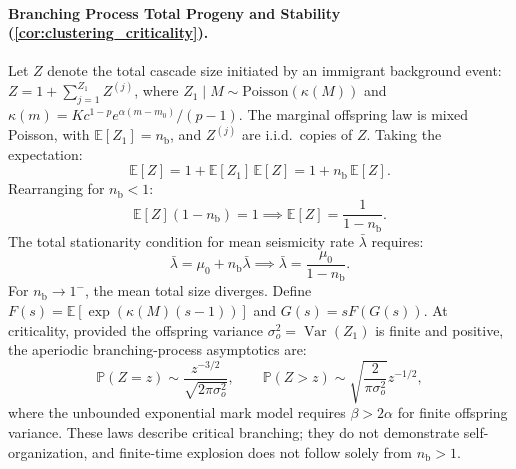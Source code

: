 \paragraph{Branching Process Total Progeny and Stability
(\cref{cor:clustering_criticality}).}
Let $Z$ denote the total cascade size initiated by an immigrant
background event:
$Z = 1 + \sum_{j=1}^{Z_1} Z^{(j)}$, where
$Z_1\mid M\sim\mathrm{Poisson}(\kappa(M))$ and
$\kappa(m)=Kc^{1-p}e^{\alpha(m-m_0)}/(p-1)$.
The marginal offspring law is mixed Poisson, with
$\mathbb{E}[Z_1]=n_{\mathrm{b}}$, and $Z^{(j)}$ are
i.i.d.\ copies of $Z$.
Taking the expectation:
\begin{equation}
  \mathbb{E}[Z] = 1 + \mathbb{E}[Z_1]\,\mathbb{E}[Z] = 1 +
  n_{\mathrm{b}}\,\mathbb{E}[Z].
\end{equation}
Rearranging for $n_{\mathrm{b}} < 1$:
\begin{equation}
  \mathbb{E}[Z](1 - n_{\mathrm{b}}) = 1 \implies \mathbb{E}[Z] =
  \frac{1}{1 - n_{\mathrm{b}}}.
  \label{eq:supp_total_progeny}
\end{equation}
The total stationarity condition for mean seismicity rate
$\bar{\lambda}$ requires:
\begin{equation}
  \bar{\lambda} = \mu_0 + n_{\mathrm{b}}\bar{\lambda} \implies
  \bar{\lambda} = \frac{\mu_0}{1 - n_{\mathrm{b}}}.
\end{equation}
For $n_{\mathrm{b}}\to1^-$, the mean total size diverges. Define
$F(s)=\mathbb{E}[\exp(\kappa(M)(s-1))]$ and $G(s)=sF(G(s))$.
At criticality, provided the offspring variance
$\sigma_o^2=\operatorname{Var}(Z_1)$ is finite and positive, the
aperiodic branching-process asymptotics are:
\begin{equation}
  \mathbb{P}(Z=z)\sim\frac{z^{-3/2}}{\sqrt{2\pi\sigma_o^2}},
  \qquad \mathbb{P}(Z>z)\sim\sqrt{\frac{2}{\pi\sigma_o^2}}z^{-1/2},
\end{equation}
where the unbounded exponential mark model requires $\beta>2\alpha$
for finite offspring variance. These laws describe critical branching;
they do not demonstrate self-organization, and finite-time explosion
does not follow solely from $n_{\mathrm{b}}>1$.


